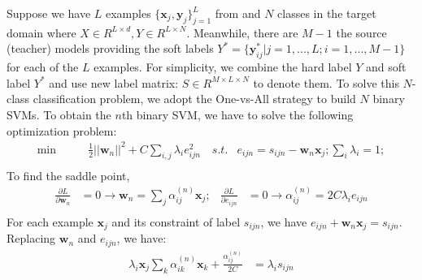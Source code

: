 Suppose we have $L$ examples $\{\textbf{x}_j,\textbf{y}_j\}_{j=1}^L$ from and $N$ classes in the target domain where $X\in R^{L\times d}, Y\in R^{L\times N}$. Meanwhile, there are $M-1$ the source (teacher) models providing the soft labels $Y^*=\{\textbf{y}^*_{ij}|j=1,...,L;i=1,...,M-1\}$ for each of the $L$ examples.
For simplicity, we combine the hard label $Y$ and soft label $Y^*$ and use new label matrix: $S \in R^{M\times L \times N}$ to denote them. To solve this $N$-class classification problem, we adopt the One-vs-All strategy to build $N$ binary SVMs.
To obtain the $n$th binary SVM, we have to solve the following optimization problem: 
\begin{equation}\label{eq:multi-distill}
\begin{aligned}
\min \qquad & \frac{1}{2}{|| \textbf{w}_n ||^2} + C\sum_{i,j} \lambda_i{e_{ijn}^2} \quad
s.t. & e_{ijn} = s_{ijn} - \textbf{w}_n\textbf{x}_j;\sum_i\lambda_i=1;\\
\end{aligned}  
\end{equation}
To find the saddle point, 
\begin{equation}
\begin{aligned}
\frac{{\partial L}}{{\partial \textbf{w}_n}}& =0 \rightarrow \textbf{w}_n = \sum_{j}\alpha^{(n)}_{ij} {\textbf{x}_j}; &
\frac{{\partial L}}{{\partial {e_{ijn}}}} & =0 \rightarrow \alpha^{(n)}_{ij} = 2C\lambda_i {e_{ijn}}\\
\end{aligned}
\end{equation}
For each example $\textbf{x}_j$ and its constraint of label $s_{ijn}$, we have $e_{ijn}  + \textbf{w}_n\textbf{x}_j= s_{ijn}$. Replacing $\textbf{w}_n$ and $e_{ijn}$,  we have:  
\begin{equation}
\begin{aligned}
\lambda_i\textbf{x}_j\sum_{k}\alpha^{(n)}_{ik}\textbf{x}_k+\frac{\alpha^{(n)}_{ij}}{2C}&=\lambda_is_{ijn}
\end{aligned}
\end{equation}
